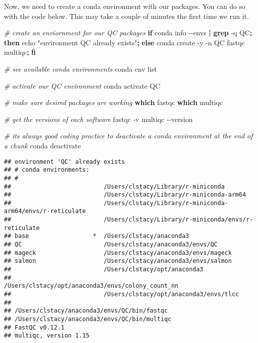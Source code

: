 \documentclass[
]{book}
\newenvironment{Shaded}{\begin{snugshade}}{\end{snugshade}}
\newcommand{\AttributeTok}[1]{\textcolor[rgb]{0.13,0.29,0.53}{#1}}
\newcommand{\BuiltInTok}[1]{#1}
\newcommand{\CommentTok}[1]{\textcolor[rgb]{0.56,0.35,0.01}{\textit{#1}}}
\newcommand{\ControlFlowTok}[1]{\textcolor[rgb]{0.13,0.29,0.53}{\textbf{#1}}}
\newcommand{\ExtensionTok}[1]{#1}
\newcommand{\FunctionTok}[1]{\textcolor[rgb]{0.13,0.29,0.53}{\textbf{#1}}}
\newcommand{\KeywordTok}[1]{\textcolor[rgb]{0.13,0.29,0.53}{\textbf{#1}}}
\newcommand{\NormalTok}[1]{#1}
\newcommand{\StringTok}[1]{\textcolor[rgb]{0.31,0.60,0.02}{#1}}
\begin{document}
Now, we need to create a conda environment with our packages. You can do so with the code below. This may take a couple of minutes the first time we run it.

\begin{Shaded}
\begin{Highlighting}[]
\CommentTok{\# create an enviornment for our QC packages}
\ControlFlowTok{if} \ExtensionTok{conda}\NormalTok{ info }\AttributeTok{{-}{-}envs} \KeywordTok{|} \FunctionTok{grep} \AttributeTok{{-}q}\NormalTok{ QC}\KeywordTok{;} \ControlFlowTok{then} \BuiltInTok{echo} \StringTok{"environment \textquotesingle{}QC\textquotesingle{} already exists"}\KeywordTok{;} \ControlFlowTok{else} \ExtensionTok{conda}\NormalTok{ create }\AttributeTok{{-}y} \AttributeTok{{-}n}\NormalTok{ QC fastqc multiqc}\KeywordTok{;} \ControlFlowTok{fi}

\CommentTok{\# see available conda environments}
\ExtensionTok{conda}\NormalTok{ env list}

\CommentTok{\# activate our QC environment}
\ExtensionTok{conda}\NormalTok{ activate QC}

\CommentTok{\# make sure desired packages are working}
\FunctionTok{which}\NormalTok{ fastqc}
\FunctionTok{which}\NormalTok{ multiqc}

\CommentTok{\# get the versions of each software}
\ExtensionTok{fastqc} \AttributeTok{{-}v}
\ExtensionTok{multiqc} \AttributeTok{{-}{-}version}

\CommentTok{\# it\textquotesingle{}s always good coding practice to deactivate a conda environment at the end of a chunk}
\ExtensionTok{conda}\NormalTok{ deactivate}
\end{Highlighting}
\end{Shaded}

\begin{verbatim}
## environment 'QC' already exists
## # conda environments:
## #
##                          /Users/clstacy/Library/r-miniconda
##                          /Users/clstacy/Library/r-miniconda-arm64
##                          /Users/clstacy/Library/r-miniconda-arm64/envs/r-reticulate
##                          /Users/clstacy/Library/r-miniconda/envs/r-reticulate
## base                  *  /Users/clstacy/anaconda3
## QC                       /Users/clstacy/anaconda3/envs/QC
## mageck                   /Users/clstacy/anaconda3/envs/mageck
## salmon                   /Users/clstacy/anaconda3/envs/salmon
##                          /Users/clstacy/opt/anaconda3
##                          /Users/clstacy/opt/anaconda3/envs/colony_count_nn
##                          /Users/clstacy/opt/anaconda3/envs/tlcc
## 
## /Users/clstacy/anaconda3/envs/QC/bin/fastqc
## /Users/clstacy/anaconda3/envs/QC/bin/multiqc
## FastQC v0.12.1
## multiqc, version 1.15
\end{verbatim}
\end{document}
